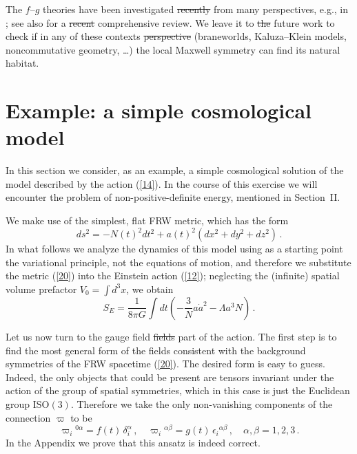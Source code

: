 \documentclass[11pt, a4paper]{article}
\newcommand{\lang}[1]{\textcolor{langfix}{#1}}
\newcommand{\subst}[1]{\textcolor{substantive}{#1}}
\newcommand{\rem}[1]{\textcolor{removeprop}{\sout{#1}}}
\begin{document}
The $f$--$g$ theories have been investigated \rem{recently} from many perspectives, e.g., in \cite{Banados:2008fi, Damour:2002wu, Damour:2002ws, ArkaniHamed:2002sp, Blas:2005yk, Speziale:2010cf}; see also \cite{Clifton:2011jh} for a \rem{recent} comprehensive review. We leave it to \rem{the} future work to check if in any of these \lang{contexts} \rem{perspective} (braneworlds, Kaluza--Klein models, noncommutative geometry, \ldots) the local Maxwell symmetry can find its natural habitat.

\section{Example: a simple cosmological model}\label{sec:cosmo}

In this section we consider, as an example, a simple cosmological solution of the model described by the action (\ref{14}). In the course of this exercise we will encounter the problem of non-positive-definite energy, mentioned in Section~II.

We make use of the simplest, flat FRW metric, which has the form
\begin{equation}\label{20}
ds^2 =-N(t)^2dt^2+a(t)^2 (dx^2+dy^2+dz^2)\,.
\end{equation}
In what follows we analyze the dynamics of this model using as a starting point the variational principle, not the equations of motion, and therefore we substitute the metric (\ref{20}) into the Einstein action (\ref{12}); neglecting the (infinite) spatial volume prefactor \subst{$V_0 = \int d^3x$}, we obtain
\begin{equation}
S_E=\frac{1}{8\pi G}\int dt \left(-\frac{3}{N}a\dot a^2-\Lambda a^3 N\right)\,.\label{21}
\end{equation}

Let us now turn to the gauge \lang{field} \rem{fields} part of the action. The first step is to find the most general form of the fields consistent with the background symmetries of the FRW spacetime (\ref{20}). The desired form is easy to guess. Indeed, the only objects that could be present are tensors invariant under \lang{the} action of the group of spatial symmetries, which in this case is just the Euclidean group \subst{$\mathrm{ISO}(3)$}. Therefore we take the only non-vanishing components of the connection $\varpi$ to be
\begin{equation}\label{22}
\varpi_i{}^{0\alpha} = f(t)\, \delta_i^\alpha\,, \quad \varpi_i{}^{\alpha\beta} = g(t)\, \epsilon_i{}^{\alpha\beta}\,,\quad \alpha,\beta=1,2,3\,.
\end{equation}
In the Appendix we prove that this ansatz is indeed correct.
\end{document}
